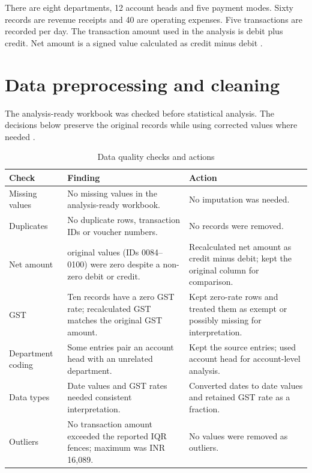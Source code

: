 \documentclass[11pt,a4paper]{article}
\begin{document}
There are eight departments, 12 account heads and five payment modes. Sixty records are revenue receipts and 40 are operating expenses. Five transactions are recorded per day. The transaction amount used in the analysis is debit plus credit. Net amount is a signed value calculated as credit minus debit \cite{dataset,description}.

\clearpage
\section{Data preprocessing and cleaning}
The analysis-ready workbook was checked before statistical analysis. The decisions below preserve the original records while using corrected values where needed \cite{projectreport,dataset}.

\begin{table}[H]
\centering
\caption{Data quality checks and actions}
\small
\begin{tabularx}{\textwidth}{>{\raggedright\arraybackslash}p{}>{\raggedright\arraybackslash}p{}X}
\toprule
Check & Finding & Action\\
\midrule
Missing values & No missing values in the analysis-ready workbook. & No imputation was needed.\\
Duplicates & No duplicate rows, transaction IDs or voucher numbers. & No records were removed.\\
Net amount & 17 original values (IDs 0084--0100) were zero despite a non-zero debit or credit. & Recalculated net amount as credit minus debit; kept the original column for comparison.\\
GST & Ten records have a zero GST rate; recalculated GST matches the original GST amount. & Kept zero-rate rows and treated them as exempt or possibly missing for interpretation.\\
Department coding & Some entries pair an account head with an unrelated department. & Kept the source entries; used account head for account-level analysis.\\
Data types & Date values and GST rates needed consistent interpretation. & Converted dates to date values and retained GST rate as a fraction.\\
Outliers & No transaction amount exceeded the reported IQR fences; maximum was INR 16,089. & No values were removed as outliers.\\
\bottomrule
\end{tabularx}
\end{table}
\end{document}
